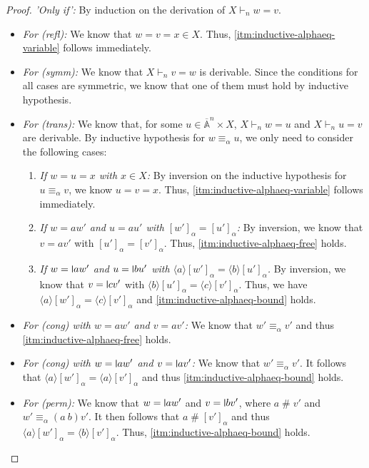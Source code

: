 \documentclass[11pt,a4paper]{amsart}
\newcommand{\Names}{\mathbb{A}}
\newcommand{\barNames}{\overline{\Names}}
\newcommand{\alphaeq}{\equiv_\alpha}
\newcommand{\fresh}{\mathbin{\#}}
\newcommand{\bind}[1]{\langle #1\rangle}
\theoremstyle{plain}
\newcommand{\midmid}{\hspace{0.2ex}{\rule[-0.1ex]{0.6pt}{1.65ex}}\hspace{0.2ex}}
\newcommand{\newletter}[1]{{\midmid}#1}
\numberwithin{equation}{section}
\newcommand{\+}[1]{\mathcal{#1}\xspace}
\theoremstyle{definition}
\begin{document}
\begin{proof}
  \noindent\emph{'Only if':}
  By induction on the derivation of \(X \vdash_n w = v\).
  \begin{itemize}
    \item \emph{For (refl):}
      We know that \(w = v = x \in X\).
      Thus, \eqref{itm:inductive-alphaeq-variable} follows immediately.
    \item \emph{For (symm):}
      We know that \(X \vdash_n v = w\) is derivable.
      Since the conditions for all cases are symmetric, we know that one of them must hold by inductive hypothesis.
    \item \emph{For (trans):}
      We know that, for some \(u \in \barNames^n \times X\), \(X \vdash_n w = u\) and \(X \vdash_n u = v\) are derivable.
      By inductive hypothesis for \(w \alphaeq u\), we only need to consider the following cases:
      \begin{enumerate}
        \item
          \emph{If \(w = u = x\) with \(x \in X\):}
          By inversion on the inductive hypothesis for \(u \alphaeq v\), we know \(u = v = x\).
          Thus, \eqref{itm:inductive-alphaeq-variable} follows immediately.
        \item
          \emph{If \(w = aw'\) and \(u = au'\) with \([w']_\alpha = [u']_\alpha\):}
          By inversion, we know that \(v = av'\) with \([u']_\alpha = [v']_\alpha\).
          Thus, \eqref{itm:inductive-alphaeq-free} holds.
        \item
          \emph{If \(w = \newletter{a}w'\) and \(u = \newletter{b}u'\) with \(\bind{a}[w']_\alpha = \bind{b}[u']_\alpha\).}
          By inversion, we know that \(v = \newletter{c}v'\) with \(\bind{b}[u']_\alpha = \bind{c}[v']_\alpha\).
          Thus, we have \(\bind{a}[w']_\alpha = \bind{c}[v']_\alpha\) and \eqref{itm:inductive-alphaeq-bound} holds.
      \end{enumerate}
    \item
      \emph{For (cong) with \(w = aw'\) and \(v = av'\):}
      We know that \(w' \alphaeq v'\) and thus \eqref{itm:inductive-alphaeq-free} holds.
    \item
      \emph{For (cong) with \(w = \newletter{a}w'\) and \(v = \newletter{a}v'\):}
      We know that \(w' \alphaeq v'\).
      It follows that \(\bind{a}[w']_\alpha = \bind{a}[v']_\alpha\) and thus \eqref{itm:inductive-alphaeq-bound} holds.
    \item
      \emph{For (perm):}
      We know that \(w = \newletter{a}w'\) and \(v = \newletter{b}v'\), where \(a \fresh v'\) and \(w' \alphaeq (a\ b)v'\).
      It then follows that \(a \fresh [v']_\alpha\) and thus \(\bind{a}[w']_\alpha = \bind{b}[v']_\alpha\).
      Thus, \eqref{itm:inductive-alphaeq-bound} holds.
  \end{itemize}
\end{proof}
\end{document}
